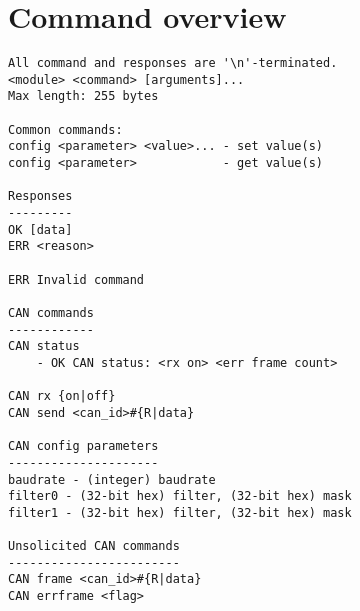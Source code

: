 \documentclass{article}[a4paper]
\begin{document}

\begin{comment}

\section{LIN}
LIN commands
------------
LIN send <id>
LIN set txbuffer <n> <data>     - empty <data> disables TX buffer

Unsolicited commands:
LIN frame
error?

\end{comment}

\section{Command overview}
\begin{verbatim}
All command and responses are '\n'-terminated.
<module> <command> [arguments]...
Max length: 255 bytes

Common commands:
config <parameter> <value>... - set value(s)
config <parameter>            - get value(s)

Responses
---------
OK [data]
ERR <reason>

ERR Invalid command

CAN commands
------------
CAN status
    - OK CAN status: <rx on> <err frame count>

CAN rx {on|off}
CAN send <can_id>#{R|data}

CAN config parameters
---------------------
baudrate - (integer) baudrate
filter0 - (32-bit hex) filter, (32-bit hex) mask
filter1 - (32-bit hex) filter, (32-bit hex) mask

Unsolicited CAN commands
------------------------
CAN frame <can_id>#{R|data}
CAN errframe <flag>
\end{verbatim}
\end{document}
